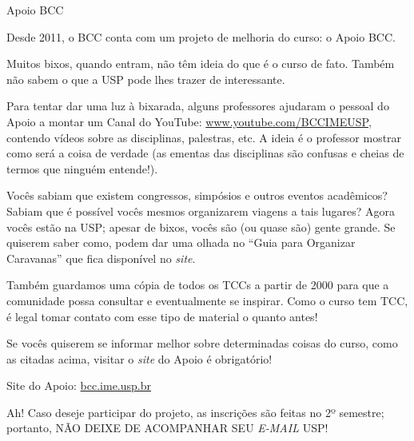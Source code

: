 \begin{subsubsecao}{Apoio BCC}

Desde 2011, o BCC conta com um projeto de melhoria do curso: o Apoio BCC.

Muitos bixos, quando entram, não têm ideia do que é o curso de fato. Também não 
sabem o que a USP pode lhes trazer de interessante.

Para tentar dar uma luz à bixarada, alguns professores ajudaram o pessoal do
Apoio a montar um Canal do YouTube: \url{www.youtube.com/BCCIMEUSP}, contendo
vídeos sobre as disciplinas, palestras, etc. A ideia é o professor mostrar como
será a coisa de verdade (as ementas das disciplinas são confusas e cheias de
termos que ninguém entende!).

Vocês sabiam que existem congressos, simpósios e outros eventos acadêmicos?
Sabiam que é possível vocês mesmos organizarem viagens a tais lugares? Agora
vocês estão na USP; apesar de bixos, vocês são (ou quase são) gente grande. Se
quiserem saber como, podem dar uma olhada no ``Guia para Organizar Caravanas''
que fica disponível no \textit{site}.

Também guardamos uma cópia de todos os TCCs a partir de 2000 para que a 
comunidade possa consultar e eventualmente se inspirar. Como o curso tem TCC, é 
legal tomar contato com esse tipo de material o quanto antes!

Se vocês quiserem se informar melhor sobre determinadas coisas do curso, como as
citadas acima, visitar o \textit{site} do Apoio é obrigatório!

Site do Apoio: \url{bcc.ime.usp.br}

Ah! Caso deseje participar do projeto, as inscrições são feitas no 2º 
semestre; portanto, NÃO DEIXE DE ACOMPANHAR SEU \textit{E-MAIL} USP!

\end{subsubsecao}
